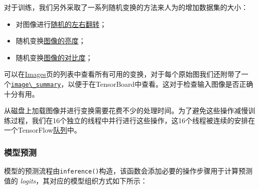 对于训练，我们另外采取了一系列随机变换的方法来人为的增加数据集的大小：

\begin{itemize}
\tightlist
\item
  对图像进行\href{https://github.com/jikexueyuanwiki/tensorflow-zh/blob/master/SOURCE/api_docs/python/image.md\#random_flip_left_right}{随机的左右翻转}；
\item
  随机变换\href{https://github.com/jikexueyuanwiki/tensorflow-zh/blob/master/SOURCE/api_docs/python/image.md\#random_brightness}{图像的亮度}；
\item
  随机变换\href{https://github.com/jikexueyuanwiki/tensorflow-zh/blob/master/SOURCE/api_docs/python/image.md\#tf_image_random_contrast}{图像的对比度}；
\end{itemize}

可以在\href{https://github.com/jikexueyuanwiki/tensorflow-zh/blob/master/SOURCE/api_docs/python/image.md}{Images}页的列表中查看所有可用的变换，对于每个原始图我们还附带了一个\href{https://github.com/jikexueyuanwiki/tensorflow-zh/blob/master/SOURCE/api_docs/python/train.md\#image_summary}{\lstinline{image\_summary}}，以便于在TensorBoard中查看。这对于检查输入图像是否正确十分有用。

从磁盘上加载图像并进行变换需要花费不少的处理时间。为了避免这些操作减慢训练过程，我们在16个独立的线程中并行进行这些操作，这16个线程被连续的安排在一个TensorFlow\href{https://github.com/jikexueyuanwiki/tensorflow-zh/blob/master/SOURCE/api_docs/python/io_ops.md\#shuffle_batch}{队列}中。

\subsubsection{模型预测 }\label{ux6a21ux578bux9884ux6d4b}

模型的预测流程由\lstinline{inference()}构造，该函数会添加必要的操作步骤用于计算预测值的
\emph{logits}，其对应的模型组织方式如下所示：

